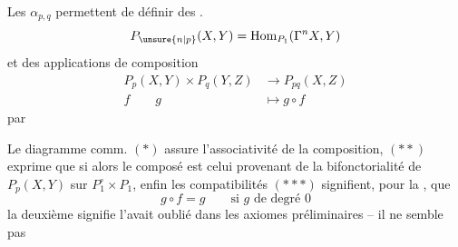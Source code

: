 Les $\alpha_{p,q}$ permettent de définir des
\uline{}.
\[
P_{\unsure{n|p}}(X,Y)=\operatorname{Hom}_{P_1}(\Gamma^n X,Y)
\]
et des applications de composition
\[
\begin{aligned}
P_p(X,Y)\times P_q(Y,Z)&\longrightarrow P_{pq}(X,Z)\\
f\qquad g&\longmapsto g\circ f
\end{aligned}
\]
par

Le diagramme comm. $(*)$ assure l'associativité
de la composition, $(**)$  exprime que si   alors le composé est celui
provenant de la bifonctorialité de
$P_p(X,Y)$ sur $P_1^\circ\times P_1$, enfin les compatibilités
$(***)$ signifient, pour la , que
\[
g\circ f=g\qquad\text{si $g$ de degré $0$}
\]
la deuxième signifie
 l'avait oublié dans les axiomes
préliminaires -- il ne semble pas
